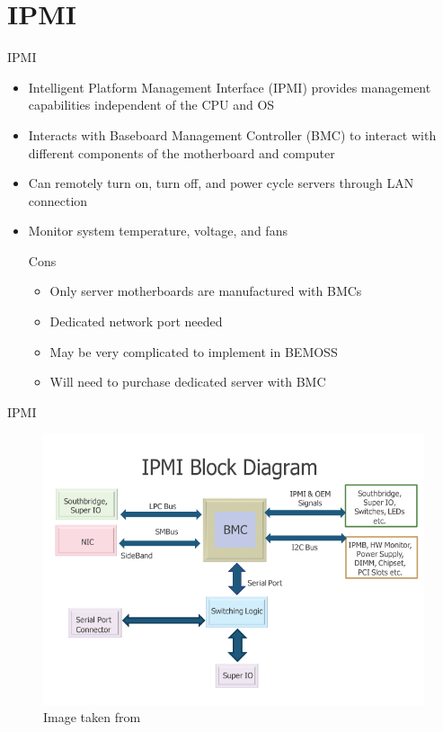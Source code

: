 \documentclass{beamer}
\begin{document}
\section{IPMI}
\begin{frame}{IPMI}
\begin{itemize}
\item Intelligent Platform Management Interface (IPMI) provides management capabilities independent of the CPU and OS
\item Interacts with Baseboard Management Controller (BMC) to interact with different components of the motherboard and computer
\item Can remotely turn on, turn off, and power cycle servers through LAN connection
\item Monitor system temperature, voltage, and fans 	
\begin{block}{Cons}
\begin{itemize}
\item Only server motherboards are manufactured with BMCs
\item Dedicated network port needed
\item May be very complicated to implement in BEMOSS
\item Will need to purchase dedicated server with BMC
\end{itemize}
\end{block}
\end{itemize}
\end{frame}

\begin{frame}{IPMI}
\begin{figure}
\includegraphics[scale=0.35]{../figs/ipmiBlockDiagram}
\caption{Image taken from \cite{IPMI}}
\end{figure}
\end{frame}
\end{document}
